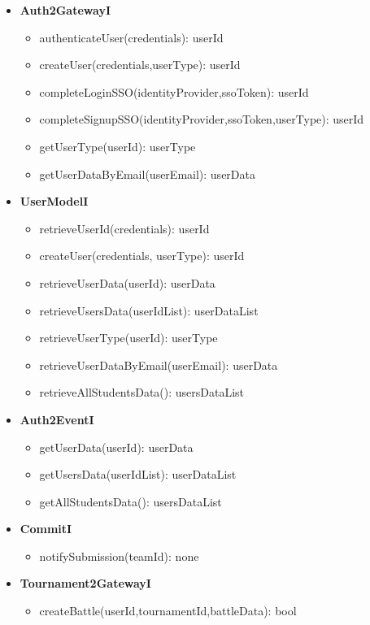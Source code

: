 \begin{itemize}
\begin{itemize}
    \end{itemize}
    \newpage
    \item \textbf{Auth2GatewayI}
    \begin{itemize}
        \item authenticateUser(credentials): userId
        \item createUser(credentials,userType): userId
        \item completeLoginSSO(identityProvider,ssoToken): userId
        \item completeSignupSSO(identityProvider,ssoToken,userType): userId
        \item getUserType(userId): userType
        \item getUserDataByEmail(userEmail): userData
    \end{itemize}
    \item \textbf{UserModelI}
    \begin{itemize}
        \item retrieveUserId(credentials): userId
        \item createUser(credentials, userType): userId
        \item retrieveUserData(userId): userData
        \item retrieveUsersData(userIdList): userDataList
        \item retrieveUserType(userId): userType
        \item retrieveUserDataByEmail(userEmail): userData
        \item retrieveAllStudentsData(): usersDataList
    \end{itemize}
    \item \textbf{Auth2EventI}
    \begin{itemize}
        \item getUserData(userId): userData
        \item getUsersData(userIdList): userDataList
        \item getAllStudentsData(): usersDataList
    \end{itemize}
    \item \textbf{CommitI}
    \begin{itemize}
        \item notifySubmission(teamId): none
    \end{itemize}
    \item \textbf{Tournament2GatewayI}
    \begin{itemize}
        \item createBattle(userId,tournamentId,battleData): bool

\end{itemize}
\end{itemize}
